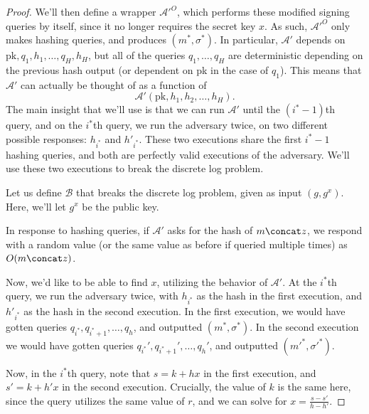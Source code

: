 \documentclass[12pt]{tufte-book}
\begin{document}
\begin{proof}
    We'll then define a wrapper $\mathcal{A}'^{O}$, which performs these modified signing queries by itself, since it no longer requires the secret key $x$. As such, $\mathcal{A}'^O$ only makes hashing queries, and produces $(m^*, \sigma^*)$. In particular, $\mathcal{A}'$ depends on $\mathrm{pk}, q_1, h_1, \ldots, q_H, h_H$, but all of the queries $q_1, \ldots, q_H$ are deterministic depending on the previous hash output (or dependent on pk in the case of $q_1$). This means that $\mathcal{A}'$ can actually be thought of as a function of
    \[
        \mathcal{A}'(\mathrm{pk}, h_1, h_2, \ldots, h_H)
    .\]
    The main insight that we'll use is that we can run $\mathcal{A}'$ until the $(i^* - 1)$th query, and on the $i^*$th query, we run the adversary twice, on two different possible responses: $h_{i^*}$ and $h'_{i^*}$. These two executions share the first $i^* - 1$ hashing queries, and both are perfectly valid executions of the adversary. We'll use these two executions to break the discrete log problem.

    Let us define $\mathcal{B}$ that breaks the discrete log problem, given as input $(g, g^x)$. Here, we'll let $g^x$ be the public key.

    In response to hashing queries, if $\mathcal{A}'$ asks for the hash of $m \concat z$, we respond with a random value (or the same value as before if queried multiple times) as $O(m \concat z)$.

    Now, we'd like to be able to find $x$, utilizing the behavior of $\mathcal{A}'$.
    At the $i^*$th query, we run the adversary twice, with $h_{i^*}$ as the hash in the first execution, and $h'_{i^*}$ as the hash in the second execution. In the first execution, we would have gotten queries $q_{i^*}, q_{i^*+1}, \ldots, q_h$, and outputted $(m^*, \sigma^*)$. In the second execution we would have gotten queries $q_{i^*}', q_{i^*+1}', \ldots, q_h'$, and outputted $(m'^*, \sigma'^*)$.

    Now, in the $i^*$th query, note that $s = k + hx$ in the first execution, and $s' = k + h' x$ in the second execution. Crucially, the value of $k$ is the same here, since the query utilizes the same value of $r$, and we can solve for $x = \frac{s - s'}{h - h'}$.


\end{proof}
\end{document}
